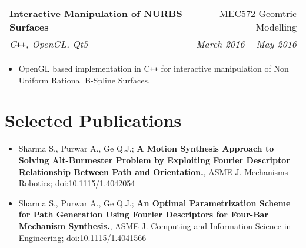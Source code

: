 \documentclass[letterpaper,10pt]{article}
\makeatletter
\newcommand{\resumeHeading}[4]{
  \vspace{-1pt}
    \begin{tabular*}{0.97\textwidth}{l@{\extracolsep{\fill}}r}
      \textbf{#1} & #2 \vspace{-2pt}\\ \vspace{1pt}
      \textit{\small#3} & \textit{\small #4} \\
    \end{tabular*}
}
\newcommand{\resumeSection}[1]{
\vspace{-12pt}
\section{\textbf{#1}}
}
\newcommand{\resumeItemListStart}{
\vspace{-7pt}
\begin{itemize}[leftmargin=14pt]
}
\newcommand{\resumeItemListEnd}{
\vspace{+7pt}
\end{itemize}
}
\newcommand{\resumeItem}[1]{
  \item\small{
      {#1 \vspace{-7pt}
      }
  }
}
\makeatother
\begin{document}
    \vspace{-2pt}
    \resumeHeading{Interactive Manipulation of NURBS Surfaces}{MEC572 Geomtric Modelling}{C\texttt{++}, OpenGL, Qt5}{March 2016 -- May 2016}
    \resumeItemListStart
      \resumeItem{OpenGL based implementation in C\texttt{++} for interactive manipulation of Non Uniform Rational B-Spline Surfaces.}
    \resumeItemListEnd
    

\resumeSection{Selected Publications}
\vspace{+7pt}
    \resumeItemListStart
    
      \resumeItem{Sharma S., Purwar A., Ge Q.J.; \textbf{A Motion Synthesis Approach to Solving Alt-Burmester Problem by Exploiting Fourier Descriptor Relationship Between Path and Orientation.}, ASME J. Mechanisms Robotics; doi:10.1115/1.4042054}
      \resumeItem{Sharma S., Purwar A., Ge Q.J.; \textbf{An Optimal Parametrization Scheme for Path Generation Using Fourier Descriptors for Four-Bar Mechanism Synthesis.}, ASME J. Computing and Information Science in Engineering; doi:10.1115/1.4041566}
      
    \resumeItemListEnd
\end{document}
